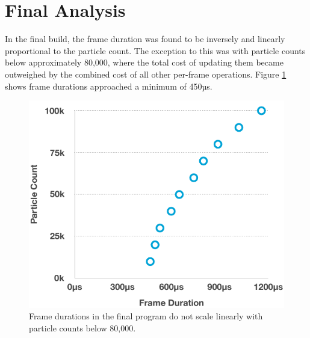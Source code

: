 \documentclass[11pt, a4paper, twocolumn]{article}
\begin{document}


\section{Final Analysis}

In the final build, the frame duration was found to be inversely and linearly proportional to the particle count. The exception to this was with particle counts below approximately 80,000, where the total cost of updating them became outweighed by the combined cost of all other per-frame operations. Figure \ref{fig:duration-tenthousand} shows frame durations approached a minimum of 450µs.

\begin{figure}[h]
\includegraphics[width=\linewidth]{duration-tenthousand}
\caption{Frame durations in the final program do not scale linearly with particle counts below 80,000.}
\label{fig:duration-tenthousand}
\end{figure}
\end{document}

